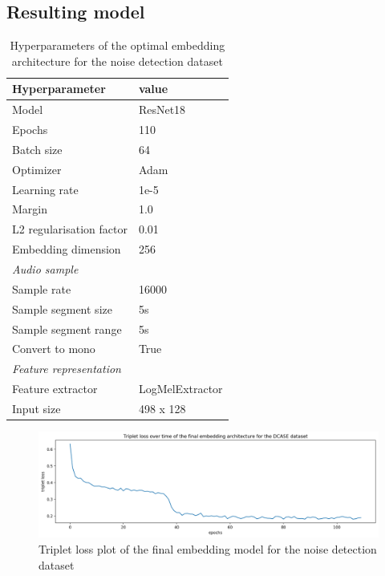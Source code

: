 \subsection{Resulting model}
\label{sub:Results-DCASE-Resulting-Model}
\begin{table}[ht]
    \centering
    \caption{Hyperparameters of the optimal embedding architecture for the noise detection dataset}
	\label{tab:Hyperparameters-DCASE}
    \begin{tabular}{l|l}
        \toprule
        \textbf{Hyperparameter} & \textbf{value} \\ 
        \midrule[1pt]
        Model & ResNet18 \\ 
        \hline
        Epochs & 110 \\ 
        \hline
        Batch size & 64 \\ 
        \hline
        Optimizer & Adam \\ 
        \hline
        Learning rate & 1e-5 \\
        \hline
        Margin & 1.0 \\
        \hline
        L2 regularisation factor & 0.01 \\
        \hline
        Embedding dimension & 256 \\
        \midrule[1pt]
        \multicolumn{2}{l}{\textit{Audio sample}} \\
        \midrule[1pt]
        Sample rate & 16000 \\ 
        \hline
        Sample segment size & 5s \\
        \hline
        Sample segment range & 5s \\
        \hline
        Convert to mono & True \\
        \midrule[1pt]
        \multicolumn{2}{l}{\textit{Feature representation}} \\
        \midrule[1pt]
        Feature extractor & LogMelExtractor \\ 
        \hline
        Input size & 498 x 128 \\
        \bottomrule
    \end{tabular}
\end{table}
\begin{figure}[ht]
\centering
    \includegraphics[width=0.95\linewidth]{img/Triplet_loss_DCASE_final.png}
    \caption{Triplet loss plot of the final embedding model for the noise detection dataset}
    \label{fig:Triplet-Loss-DCASE}
\end{figure}
